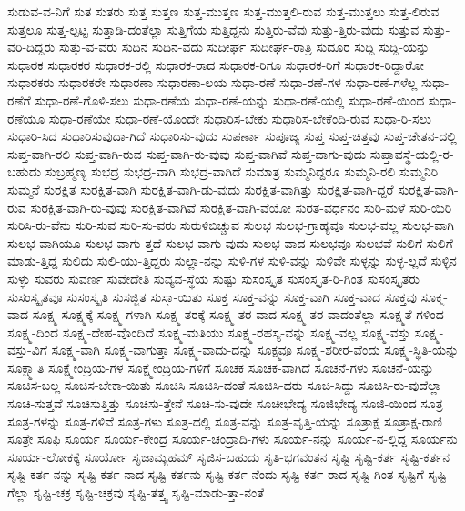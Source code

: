 {ಸುಡುವ-ವ-ನಿಗೆ
ಸುತ
ಸುತರು
ಸುತ್ತ
ಸುತ್ತಣ
ಸುತ್ತ-ಮುತ್ತಣ
ಸುತ್ತ-ಮುತ್ತಲಿ-ರುವ
ಸುತ್ತ-ಮುತ್ತಲು
ಸುತ್ತ-ಲಿರುವ
ಸುತ್ತಲೂ
ಸುತ್ತ-ಲ್ಪಟ್ಟ
ಸುತ್ತಾಡಿ-ದಂತೆಲ್ಲಾ
ಸುತ್ತಿಗೆಯ
ಸುತ್ತಿದ್ದನು
ಸುತ್ತಿರು-ವೆವು
ಸುತ್ತು-ತ್ತಿರು-ವುದು
ಸುತ್ತುವ
ಸುತ್ತು-ವರಿ-ದಿದ್ದರು
ಸುತ್ತು-ವ-ವರು
ಸುದಿನ
ಸುದಿನ-ವದು
ಸುದೀರ್ಘ
ಸುದೀರ್ಘ-ರಾತ್ರಿ
ಸುದೂರ
ಸುದ್ದಿ
ಸುದ್ದಿ-ಯನ್ನು
ಸುಧಾರಕ
ಸುಧಾರಕರ
ಸುಧಾರಕ-ರಲ್ಲಿ
ಸುಧಾರಕ-ರಾದ
ಸುಧಾರಕ-ರಿಗೂ
ಸುಧಾರಕ-ರಿಗೆ
ಸುಧಾರಕ-ರಿದ್ದಾರೋ
ಸುಧಾರಕರು
ಸುಧಾರಕರೇ
ಸುಧಾರಣಾ
ಸುಧಾರಣಾ-ಲಯ
ಸುಧಾ-ರಣೆ
ಸುಧಾ-ರಣೆ-ಗಳ
ಸುಧಾ-ರಣೆ-ಗಳೆಲ್ಲ
ಸುಧಾ-ರಣೆಗೆ
ಸುಧಾ-ರಣೆ-ಗೊಳಿ-ಸಲು
ಸುಧಾ-ರಣೆಯ
ಸುಧಾ-ರಣೆ-ಯನ್ನು
ಸುಧಾ-ರಣೆ-ಯಲ್ಲಿ
ಸುಧಾ-ರಣೆ-ಯಿಂದ
ಸುಧಾ-ರಣೆಯೂ
ಸುಧಾ-ರಣೆಯೇ
ಸುಧಾ-ರಣೆ-ಯೊಂದೇ
ಸುಧಾರಿಸ-ಬೇಕು
ಸುಧಾರಿಸ-ಬೇಕೆಂದಿ-ರುವ
ಸುಧಾ-ರಿ-ಸಲು
ಸುಧಾರಿ-ಸಿದ
ಸುಧಾರಿಸುವುದಾ-ಗಿದೆ
ಸುಧಾರಿಸು-ವುದು
ಸುಪರ್ಣಾ
ಸುಪೂಜ್ಯ
ಸುಪ್ತ
ಸುಪ್ತ-ಚಿತ್ತವು
ಸುಪ್ತ-ಚೇತನ-ದಲ್ಲಿ
ಸುಪ್ತ-ವಾಗಿ-ರಲಿ
ಸುಪ್ತ-ವಾಗಿ-ರುವ
ಸುಪ್ತ-ವಾಗಿ-ರು-ವುವು
ಸುಪ್ತ-ವಾಗಿವೆ
ಸುಪ್ತ-ವಾಗು-ವುದು
ಸುಪ್ತಾವಸ್ಥೆ-ಯಲ್ಲಿ-ರ-ಬಹುದು
ಸುಬ್ರಹ್ಮಣ್ಯ
ಸುಭದ್ರ
ಸುಭದ್ರ-ವಾಗಿ
ಸುಭದ್ರ-ವಾಗಿದೆ
ಸುಮಾತ್ರ
ಸುಮ್ಮನಿದ್ದರೂ
ಸುಮ್ಮನಿ-ರಲಿ
ಸುಮ್ಮನಿರಿ
ಸುಮ್ಮನೆ
ಸುರಕ್ಷಿತ
ಸುರಕ್ಷಿತ-ವಾಗಿ
ಸುರಕ್ಷಿತ-ವಾಗಿ-ಡು-ವುದು
ಸುರಕ್ಷಿತ-ವಾಗಿತ್ತು
ಸುರಕ್ಷಿತ-ವಾಗಿ-ದ್ದರೆ
ಸುರಕ್ಷಿತ-ವಾಗಿ-ರುವ
ಸುರಕ್ಷಿತ-ವಾಗಿ-ರು-ವುವು
ಸುರಕ್ಷಿತ-ವಾಗಿವೆ
ಸುರಕ್ಷಿತ-ವಾಗಿ-ವೆಯೋ
ಸುರತ-ವರ್ಧನಂ
ಸುರಿ-ಮಳೆ
ಸುರಿ-ಯಿರಿ
ಸುರಿಸಿ-ರು-ವೆನು
ಸುರಿ-ಸುವ
ಸುರಿ-ಸು-ವರು
ಸುರುಳಿಬಿಚ್ಚುವ
ಸುಲಭ
ಸುಲಭ-ಗ್ರಾಹ್ಯವೂ
ಸುಲಭ-ವಲ್ಲ
ಸುಲಭ-ವಾಗಿ
ಸುಲಭ-ವಾಗಿಯೂ
ಸುಲಭ-ವಾಗು-ತ್ತದೆ
ಸುಲಭ-ವಾಗು-ವುದು
ಸುಲಭ-ವಾದ
ಸುಲಭವೂ
ಸುಲಭವೆ
ಸುಲಿಗೆ
ಸುಲಿಗೆ-ಮಾಡು-ತ್ತಿದ್ದ
ಸುಲಿದು
ಸುಲಿ-ಯು-ತ್ತಿದ್ದರು
ಸುಲ್ಲಾ-ನನ್ನು
ಸುಳಿ-ಗಳ
ಸುಳಿ-ವನ್ನು
ಸುಳಿವೇ
ಸುಳ್ಳನ್ನು
ಸುಳ್ಳ-ಲ್ಲದೆ
ಸುಳ್ಳಿನ
ಸುಳ್ಳು
ಸುವರು
ಸುವರ್ಣ
ಸುವೇದೇತಿ
ಸುವ್ಯವ-ಸ್ಥೆಯ
ಸುಷ್ಟು
ಸುಸಂಸ್ಕೃತ
ಸುಸಂಸ್ಕೃತ-ರಿ-ಗಿಂತ
ಸುಸಂಸ್ಕೃತರು
ಸುಸಂಸ್ಕೃತವೂ
ಸುಸಂಸ್ಕೃತಿ
ಸುಸಜ್ಜಿತ
ಸುಸ್ತಾ-ಯಿತು
ಸೂಕ್ತ
ಸೂಕ್ತ-ವನ್ನು
ಸೂಕ್ತ-ವಾಗಿ
ಸೂಕ್ತ-ವಾದ
ಸೂಕ್ತವು
ಸೂಕ್ಮ-ವಾದ
ಸೂಕ್ಷ್ಮ
ಸೂಕ್ಷ್ಮಕ್ಕೆ
ಸೂಕ್ಷ್ಮ-ಗಳಾಗಿ
ಸೂಕ್ಷ್ಮ-ತರಕ್ಕೆ
ಸೂಕ್ಷ್ಮ-ತರ-ವಾದ
ಸೂಕ್ಷ್ಮ-ತರ-ವಾದಂತೆಲ್ಲಾ
ಸೂಕ್ಷ್ಮತೆ-ಗಳಿಂದ
ಸೂಕ್ಷ್ಮ-ದಿಂದ
ಸೂಕ್ಷ್ಮ-ದೇಹ-ವೊಂದಿದೆ
ಸೂಕ್ಷ್ಮ-ಮತಿಯು
ಸೂಕ್ಷ್ಮ-ರಹಸ್ಯ-ವನ್ನು
ಸೂಕ್ಷ್ಮ-ವಲ್ಲ
ಸೂಕ್ಷ್ಮ-ವಸ್ತು
ಸೂಕ್ಷ್ಮ-ವಸ್ತು-ವಿಗೆ
ಸೂಕ್ಷ್ಮ-ವಾಗಿ
ಸೂಕ್ಷ್ಮ-ವಾಗುತ್ತಾ
ಸೂಕ್ಷ್ಮ-ವಾದು-ದನ್ನು
ಸೂಕ್ಷ್ಮವೂ
ಸೂಕ್ಷ್ಮ-ಶರೀರ-ವೆಂದು
ಸೂಕ್ಷ್ಮ-ಸ್ಥಿತಿ-ಯನ್ನು
ಸೂಕ್ಷ್ಮಾತಿ
ಸೂಕ್ಷ್ಮೇಂದ್ರಿಯ-ಗಳ
ಸೂಕ್ಷ್ಮೇಂದ್ರಿಯ-ಗಳಿಗೆ
ಸೂಚಕ
ಸೂಚಕ-ವಾಗಿದೆ
ಸೂಚನೆ-ಗಳು
ಸೂಚನೆ-ಯನ್ನು
ಸೂಚಿಸ-ಬಲ್ಲ
ಸೂಚಿಸ-ಬೇಕಾ-ಯಿತು
ಸೂಚಿಸಿ
ಸೂಚಿಸಿ-ದಂತೆ
ಸೂಚಿಸಿ-ದರು
ಸೂಚಿ-ಸಿದ್ದು
ಸೂಚಿಸಿ-ರು-ವುದೆಲ್ಲಾ
ಸೂಚಿ-ಸುತ್ತವೆ
ಸೂಚಿಸುತ್ತಿತ್ತು
ಸೂಚಿಸು-ತ್ತೇನೆ
ಸೂಚಿ-ಸು-ವುದೇ
ಸೂಚೀಭೇದ್ಯ
ಸೂಜಿಭೇದ್ಯ
ಸೂಜಿ-ಯಿಂದ
ಸೂತ್ರ
ಸೂತ್ರ-ಗಳನ್ನು
ಸೂತ್ರ-ಗಳಿವೆ
ಸೂತ್ರ-ಗಳು
ಸೂತ್ರ-ದಲ್ಲಿ
ಸೂತ್ರ-ವನ್ನು
ಸೂತ್ರ-ವೃತ್ತಿ-ಯನ್ನು
ಸೂತ್ರಾಕ್ಷ
ಸೂತ್ರಾಕ್ಷ-ರಾಣಿ
ಸೂತ್ರೇ
ಸೂಫಿ
ಸೂರ್ಯ
ಸೂರ್ಯ-ಕೇಂದ್ರ
ಸೂರ್ಯ-ಚಂದ್ರಾದಿ-ಗಳು
ಸೂರ್ಯ-ನನ್ನು
ಸೂರ್ಯ-ನ-ಲ್ಲಿದ್ದ
ಸೂರ್ಯನು
ಸೂರ್ಯ-ಲೋಕಕ್ಕೆ
ಸೂರ್ಯೋ
ಸೃಜಾಮ್ಯಹಮ್
ಸೃಜಿಸ-ಬಹುದು
ಸೃತಿ-ಭಗವಂತನ
ಸೃಷ್ಟಿ
ಸೃಷ್ಟಿ-ಕರ್ತ
ಸೃಷ್ಟಿ-ಕರ್ತನ
ಸೃಷ್ಟಿ-ಕರ್ತ-ನನ್ನು
ಸೃಷ್ಟಿ-ಕರ್ತ-ನಾದ
ಸೃಷ್ಟಿ-ಕರ್ತನು
ಸೃಷ್ಟಿ-ಕರ್ತ-ನೆಂದು
ಸೃಷ್ಟಿ-ಕರ್ತ-ರಾದ
ಸೃಷ್ಟಿ-ಗಿಂತ
ಸೃಷ್ಟಿಗೆ
ಸೃಷ್ಟಿ-ಗೆಲ್ಲಾ
ಸೃಷ್ಟಿ-ಚಕ್ರ
ಸೃಷ್ಟಿ-ಚಕ್ರವು
ಸೃಷ್ಟಿ-ತತ್ತ್ವ
ಸೃಷ್ಟಿ-ಮಾಡು-ತ್ತಾ-ನಂತೆ
}
